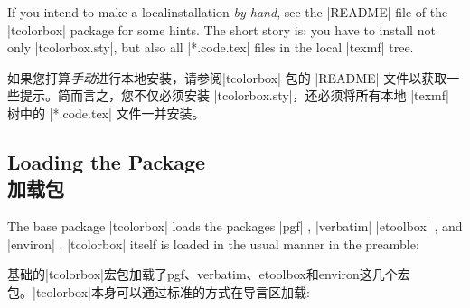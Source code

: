 If you intend to make a localinstallation \emph{by hand}, %
see the |README| file of the |tcolorbox| package for some hints. %
The short story is: you have to install not only |tcolorbox.sty|, %
but also all |*.code.tex| files in the local |texmf| tree.


如果您打算\emph{手动}进行本地安装，请参阅|tcolorbox| 包的 |README| 文件以获取一些提示。简而言之，您不仅必须安装 |tcolorbox.sty|，还必须将所有本地 |texmf| 树中的 |*.code.tex| 文件一并安装。



\subsection{Loading the Package\\加载包}


The base package |tcolorbox| loads the packages
|pgf| %
, |verbatim| %
|etoolbox| %
, and |environ| %
.
|tcolorbox| itself is loaded in the usual manner in the preamble:



基础的|tcolorbox|宏包加载了pgf、verbatim、etoolbox和environ这几个宏包。|tcolorbox|本身可以通过标准的方式在导言区加载:


\begin{dispListing}
\usepackage{tcolorbox}
\end{dispListing}

